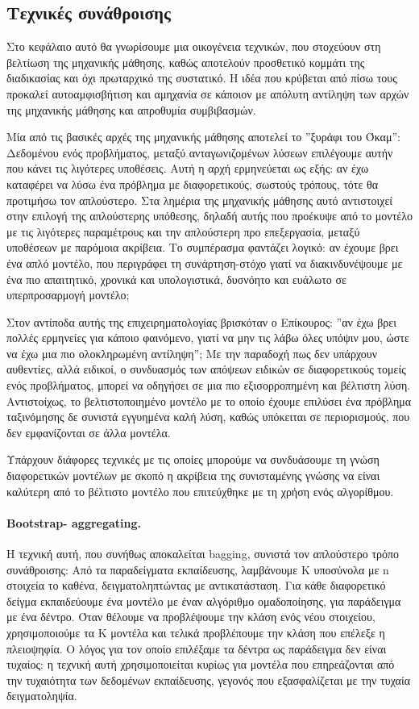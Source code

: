 \documentclass{article}
\begin{document}
 \subsection{Τεχνικές συνάθροισης}
Στο κεφάλαιο αυτό θα γνωρίσουμε μια οικογένεια τεχνικών, που στοχεύουν στη βελτίωση της μηχανικής μάθησης, καθώς αποτελούν προσθετικό κομμάτι της διαδικασίας και όχι πρωταρχικό της συστατικό. Η ιδέα που κρύβεται από πίσω τους προκαλεί αυτοαμφισβήτιση και αμηχανία σε κάποιον με απόλυτη αντίληψη των αρχών της μηχανικής μάθησης και απροθυμία συμβιβασμών.

Μία από τις βασικές αρχές της μηχανικής μάθησης αποτελεί το ”ξυράφι του Όκαμ”: Δεδομένου ενός προβλήματος, μεταξύ ανταγωνιζομένων λύσεων επιλέγουμε αυτήν που κάνει τις λιγότερες υποθέσεις. Αυτή η αρχή ερμηνεύεται ως εξής: αν έχω καταφέρει να λύσω ένα πρόβλημα με διαφορετικούς, σωστούς τρόπους, τότε θα προτιμήσω τον απλούστερο. Στα λημέρια της μηχανικής μάθησης αυτό αντιστοιχεί στην επιλογή της απλούστερης υπόθεσης, δηλαδή αυτής που προέκυψε από το μοντέλο με τις λιγότερες
παραμέτρους και την απλούστερη προ επεξεργασία, μεταξύ υποθέσεων με παρόμοια ακρίβεια. Το συμπέρασμα φαντάζει λογικό: αν έχουμε βρει ένα απλό μοντέλο, που περιγράφει τη συνάρτηση-στόχο γιατί να διακινδυνέψουμε με ένα πιο απαιτητικό, χρονικά και υπολογιστικά, δυσνόητο και ευάλωτο σε υπερπροσαρμογή μοντέλο;

Στον αντίποδα αυτής της επιχειρηματολογίας βρισκόταν ο Επίκουρος: ”αν έχω βρει πολλές ερμηνείες για κάποιο φαινόμενο, γιατί να μην τις λάβω όλες υπόψιν μου, ώστε να έχω μια πιο ολοκληρωμένη αντίληψη”; Με την παραδοχή πως δεν υπάρχουν αυθεντίες, αλλά ειδικοί, ο συνδυασμός των απόψεων ειδικών σε διαφορετικούς τομείς ενός προβλήματος, μπορεί να οδηγήσει σε μια πιο εξισορροπημένη και βέλτιστη λύση. Αντιστοίχως, το βελτιστοποιημένο μοντέλο με το οποίο έχουμε επιλύσει ένα πρόβλημα ταξινόμησης δε συνιστά εγγυημένα καλή λύση, καθώς υπόκειται σε περιορισμούς, που δεν εμφανίζονται σε άλλα μοντέλα.

Υπάρχουν διάφορες τεχνικές με τις οποίες μπορούμε να συνδυάσουμε τη γνώση διαφορετικών μοντέλων με σκοπό η ακρίβεια της συνισταμένης γνώσης να είναι καλύτερη από το βέλτιστο μοντέλο που επιτεύχθηκε με τη χρήση ενός αλγορίθμου.

\paragraph{Bootstrap- aggregating.}Η τεχνική αυτή, που συνήθως αποκαλείται bagging, συνιστά τον απλούστερο τρόπο συνάθροισης: Από τα παραδείγματα εκπαίδευσης, λαμβάνουμε Κ υποσύνολα με n στοιχεία το καθένα, δειγματοληπτώντας με αντικατάσταση. Για κάθε διαφορετικό δείγμα εκπαιδεύουμε ένα μοντέλο με έναν αλγόριθμο ομαδοποίησης, για παράδειγμα με ένα δέντρο. Όταν θέλουμε να προβλέψουμε την κλάση ενός νέου στοιχείου, χρησιμοποιούμε τα Κ μοντέλα και τελικά προβλέπουμε την κλάση που επέλεξε η πλειοψηφία. Ο λόγος για τον οποίο επιλέξαμε τα δέντρα ως παράδειγμα δεν είναι τυχαίος: η τεχνική αυτή χρησιμοποιείται κυρίως για μοντέλα που επηρεάζονται από την τυχαιότητα των δεδομένων εκπαίδευσης, γεγονός που εξασφαλίζεται με την τυχαία δειγματοληψία.
\end{document}
